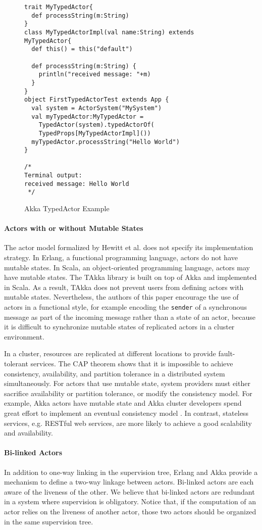 \begin{figure}[h]
\label{akka typed actor}
\begin{lstlisting}
trait MyTypedActor{
  def processString(m:String) 
}
class MyTypedActorImpl(val name:String) extends MyTypedActor{
  def this() = this("default")
  
  def processString(m:String) {
    println("received message: "+m) 
  }
}
object FirstTypedActorTest extends App {
  val system = ActorSystem("MySystem")  
  val myTypedActor:MyTypedActor =
    TypedActor(system).typedActorOf(
    TypedProps[MyTypedActorImpl]())
  myTypedActor.processString("Hello World")
}

/*
Terminal output:
received message: Hello World
 */	
\end{lstlisting}
\caption{Akka TypedActor Example}
\end{figure}

\paragraph{Actors with or without Mutable States}
The actor model formalized by Hewitt et al. \cite{Hewitt:1973} does not 
specify its implementation strategy.  In Erlang, a functional programming 
language, actors do not have mutable states.  In Scala, an
object-oriented programming language, actors may have mutable states.
The TAkka library is built on top of Akka and implemented in Scala.  
As a result, TAkka does not prevent users from defining actors with 
mutable states.
Nevertheless, the authors of this paper encourage the use of 
actors in a functional style, for example encoding the {\tt sender} of a 
synchronous message as part of the incoming message rather than a state 
of an actor, because it is difficult to synchronize mutable
states of replicated actors in a cluster environment.

In a cluster, resources are replicated at different locations to provide 
fault-tolerant services.  The CAP theorem \cite{CAP} shows that it is
impossible to achieve consistency, availability, and partition tolerance in a
distributed system simultaneously.  For actors that use mutable state, system 
providers must either sacrifice availability or partition tolerance, or modify 
the consistency model.  For example, Akka actors have mutable state and Akka 
cluster developers spend great effort to implement an eventual consistency 
model \cite{Kuhn12}. In contrast, stateless services, e.g. RESTful web 
services, are more likely to achieve a good scalability and availability.



\paragraph{Bi-linked Actors}
In addition to one-way linking in the supervision tree, Erlang and Akka
provide a mechanism to define a two-way linkage between actors. 
Bi-linked actors are each aware of the liveness of the other.  We believe that
bi-linked actors are redundant in a system where supervision is
obligatory.  Notice that, if the computation of an actor relies on the liveness
of another actor, those two actors should be organized in the same 
supervision tree.
